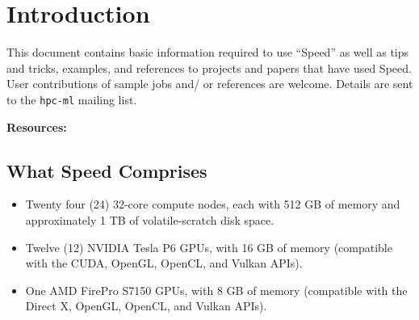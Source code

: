 \documentclass{easychair}
\begin{document}
\section{Introduction}

This document contains basic information required to use ``Speed'' as well as 
tips and tricks, examples, and references to projects and papers that have used Speed. 
User contributions of sample jobs and/ or references are welcome. 
Details are sent to the \texttt{hpc-ml} mailing list.


\textbf{Resources:}


\subsection{What Speed Comprises}

\begin{itemize}
\item
Twenty four (24) 32-core compute nodes, each with 512 GB of memory and approximately 1 TB of volatile-scratch disk space. 
\item
Twelve (12) NVIDIA Tesla P6 GPUs, with 16 GB of memory (compatible with the CUDA, OpenGL, OpenCL, and Vulkan APIs). 
\item
One AMD FirePro S7150 GPUs, with 8 GB of memory (compatible with the Direct X, OpenGL, OpenCL, and Vulkan APIs). 
\end{itemize}
\end{document}
